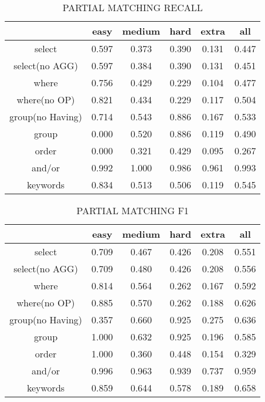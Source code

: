 \begin{table}[h!]
    \centering
    \begin{tabular}{|c|c|c|c|c|c|}
        \hline
                         & easy  & medium & hard  & extra & all   \\ \hline
        select           & 0.597 & 0.373  & 0.390 & 0.131 & 0.447 \\ \hline
        select(no AGG)   & 0.597 & 0.384  & 0.390 & 0.131 & 0.451 \\ \hline
        where            & 0.756 & 0.429  & 0.229 & 0.104 & 0.477 \\ \hline
        where(no OP)     & 0.821 & 0.434  & 0.229 & 0.117 & 0.504 \\ \hline
        group(no Having) & 0.714 & 0.543  & 0.886 & 0.167 & 0.533 \\ \hline
        group            & 0.000 & 0.520  & 0.886 & 0.119 & 0.490 \\ \hline
        order            & 0.000 & 0.321  & 0.429 & 0.095 & 0.267 \\ \hline
        and/or           & 0.992 & 1.000  & 0.986 & 0.961 & 0.993 \\ \hline

        keywords         & 0.834 & 0.513  & 0.506 & 0.119 & 0.545 \\ \hline
    \end{tabular}
    \caption{PARTIAL MATCHING RECALL }

\end{table}
\begin{table}[h!]
    \centering
    \begin{tabular}{|c|c|c|c|c|c|}
        \hline
                         & easy  & medium & hard  & extra & all   \\ \hline
        select           & 0.709 & 0.467  & 0.426 & 0.208 & 0.551 \\ \hline
        select(no AGG)   & 0.709 & 0.480  & 0.426 & 0.208 & 0.556 \\ \hline
        where            & 0.814 & 0.564  & 0.262 & 0.167 & 0.592 \\ \hline
        where(no OP)     & 0.885 & 0.570  & 0.262 & 0.188 & 0.626 \\ \hline
        group(no Having) & 0.357 & 0.660  & 0.925 & 0.275 & 0.636 \\ \hline
        group            & 1.000 & 0.632  & 0.925 & 0.196 & 0.585 \\ \hline
        order            & 1.000 & 0.360  & 0.448 & 0.154 & 0.329 \\ \hline
        and/or           & 0.996 & 0.963  & 0.939 & 0.737 & 0.959 \\ \hline

        keywords         & 0.859 & 0.644  & 0.578 & 0.189 & 0.658 \\ \hline
    \end{tabular}
    \caption{PARTIAL MATCHING F1 }

\end{table}
\pagebreak

